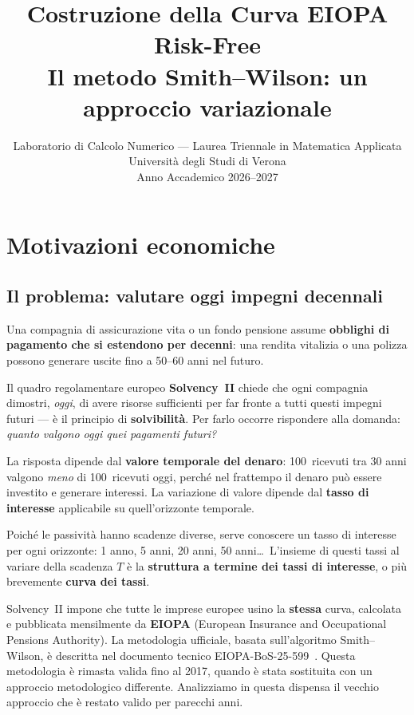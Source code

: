 \documentclass[11pt,a4paper]{article}
\title{%
  \textbf{Costruzione della Curva EIOPA Risk-Free}\\[6pt]
  \large Il metodo Smith--Wilson: un approccio variazionale\\[4pt]
}
\author{Laboratorio di Calcolo Numerico --- Laurea Triennale in Matematica Applicata\\
  Universit\`a degli Studi di Verona\\[2pt]
  Anno Accademico 2026--2027}
\date{}
\theoremstyle{plain}
\theoremstyle{definition}
\theoremstyle{remark}
\begin{document}
\maketitle
\tableofcontents
\newpage

\section{Motivazioni economiche}

\subsection{Il problema: valutare oggi impegni decennali}

Una compagnia di assicurazione vita o un fondo pensione assume \textbf{obblighi di pagamento
che si estendono per decenni}: una rendita vitalizia o una polizza possono generare uscite
fino a 50--60 anni nel futuro.

Il quadro regolamentare europeo \textbf{Solvency~II} chiede che ogni compagnia dimostri,
\emph{oggi}, di avere risorse sufficienti per far fronte a tutti questi impegni futuri ---
\`e il principio di \textbf{solvibilit\`a}. Per farlo occorre rispondere alla domanda:
\emph{quanto valgono oggi quei pagamenti futuri?}

La risposta dipende dal \textbf{valore temporale del denaro}: 100\,\texteuro{} ricevuti tra
30 anni valgono \emph{meno} di 100\,\texteuro{} ricevuti oggi, perch\'e nel frattempo il
denaro pu\`o essere investito e generare interessi. La variazione di valore dipende dal
\textbf{tasso di interesse} applicabile su quell'orizzonte temporale.

Poich\'e le passivit\`a hanno scadenze diverse, serve conoscere un tasso di interesse per
ogni orizzonte: 1 anno, 5 anni, 20 anni, 50 anni\ldots\ L'insieme di questi tassi al
variare della scadenza $T$ \`e la \textbf{struttura a termine dei tassi di interesse}, o
pi\`u brevemente \textbf{curva dei tassi}.

Solvency~II impone che tutte le imprese europee usino la \textbf{stessa} curva, calcolata e
pubblicata mensilmente da \textbf{EIOPA} (European Insurance and Occupational Pensions
Authority). La metodologia ufficiale, basata sull'algoritmo Smith--Wilson, \`e descritta nel documento tecnico
EIOPA-BoS-25-599~\cite{eiopa2025}. Questa metodologia \`e rimasta valida fino al 2017, quando \`e stata sostituita con un approccio metodologico differente. Analizziamo in questa dispensa il vecchio approccio che \`e restato valido per parecchi anni.
\end{document}
